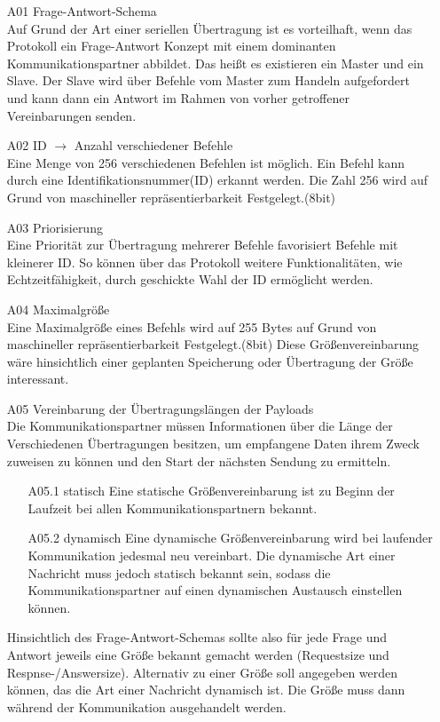 \begin{itemize}
	\item [A01] Frage-Antwort-Schema\\
Auf Grund der Art einer seriellen Übertragung ist es vorteilhaft, wenn das Protokoll ein Frage-Antwort Konzept mit einem dominanten Kommunikationspartner abbildet.
		Das heißt es existieren ein Master und ein Slave. Der Slave wird über Befehle vom Master zum Handeln aufgefordert und kann dann ein Antwort im Rahmen von vorher getroffener Vereinbarungen senden.

	\item [A02] ID $ \rightarrow $ Anzahl verschiedener Befehle\\
Eine Menge von 256 verschiedenen Befehlen ist möglich. Ein Befehl kann durch eine Identifikationsnummer(ID) erkannt werden. Die Zahl 256 wird auf Grund von maschineller repräsentierbarkeit Festgelegt.(8bit)

	\item [A03] Priorisierung\\
Eine Priorität zur Übertragung mehrerer Befehle favorisiert Befehle mit kleinerer ID. So können über das Protokoll weitere Funktionalitäten, wie Echtzeitfähigkeit, durch geschickte Wahl der ID ermöglicht werden.

	\item [A04] Maximalgröße\\
Eine Maximalgröße eines Befehls wird auf 255 Bytes auf Grund von maschineller repräsentierbarkeit Festgelegt.(8bit) Diese Größenvereinbarung wäre hinsichtlich einer geplanten Speicherung oder Übertragung der Größe interessant.

	\item [A05] Vereinbarung der Übertragungslängen der Payloads\\
		Die Kommunikationspartner müssen Informationen über die Länge der Verschiedenen Übertragungen besitzen, um empfangene Daten ihrem Zweck zuweisen zu können und den Start der nächsten Sendung zu ermitteln.
		\begin{itemize}
			\item [A05.1]statisch
				Eine statische Größenvereinbarung ist zu Beginn der Laufzeit bei allen Kommunikationspartnern bekannt.
			\item [A05.2]dynamisch
				Eine dynamische Größenvereinbarung wird bei laufender Kommunikation jedesmal neu vereinbart.
				Die dynamische Art einer Nachricht muss jedoch statisch bekannt sein, sodass die Kommunikationspartner auf einen dynamischen Austausch einstellen können.
		\end{itemize}
		Hinsichtlich des Frage-Antwort-Schemas sollte also für jede Frage und Antwort jeweils eine Größe bekannt gemacht werden (Requestsize und Respnse-/Answersize).
		Alternativ zu einer Größe soll angegeben werden können, das die Art einer Nachricht dynamisch ist. Die Größe muss dann während der Kommunikation ausgehandelt werden.


\end{itemize}
